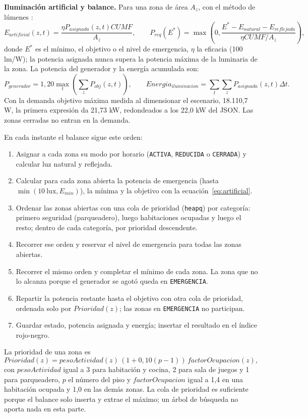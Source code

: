 \documentclass[12pt,a4paper]{article}
\newcommand{\estado}[1]{\texttt{#1}}
\newcommand{\codigo}[1]{\texttt{#1}}
\begin{document}
\textbf{Iluminación artificial y balance.} Para una zona de área $A_z$, con el método de lúmenes \cite{iesHandbook}:
\begin{equation}
 E_{artificial}(z,t)=\frac{\eta P_{asignada}(z,t)CU MF}{A_z},\qquad
 P_{req}(E^*)=\max\left(0,\frac{E^*-E_{natural}-E_{reflejada}}{\eta CU MF/A_z}\right),
 \label{eq:artificial}
\end{equation}
donde $E^*$ es el mínimo, el objetivo o el nivel de emergencia, $\eta$ la eficacia (100 lm/W); la potencia asignada nunca supera la potencia máxima de la luminaria de la zona. La potencia del generador y la energía acumulada son:
\begin{equation}
 P_{generador}=1,20\max_t\left(\sum_zP_{obj}(z,t)\right),\qquad
 Energia_{iluminacion}=\sum_t\sum_zP_{asignada}(z,t)\Delta t.
 \label{eq:generador}
\end{equation}
Con la demanda objetivo máxima medida al dimensionar el escenario, 18.110,7 W, la primera expresión da 21,73 kW, redondeados a los 22,0 kW del JSON. Las zonas cerradas no entran en la demanda.

En cada instante el balance sigue este orden:
\begin{enumerate}
    \item Asignar a cada zona su modo por horario (\estado{ACTIVA}, \estado{REDUCIDA} o \estado{CERRADA}) y calcular luz natural y reflejada.
    \item Calcular para cada zona abierta la potencia de emergencia (hasta $\min(10\ \text{lux}, E_{min})$), la mínima y la objetivo con la ecuación~\ref{eq:artificial}.
    \item Ordenar las zonas abiertas con una cola de prioridad (\codigo{heapq}) por categoría: primero seguridad (parqueadero), luego habitaciones ocupadas y luego el resto; dentro de cada categoría, por prioridad descendente.
    \item Recorrer ese orden y reservar el nivel de emergencia para todas las zonas abiertas.
    \item Recorrer el mismo orden y completar el mínimo de cada zona. La zona que no lo alcanza porque el generador se agotó queda en \estado{EMERGENCIA}.
    \item Repartir la potencia restante hasta el objetivo con otra cola de prioridad, ordenada solo por $Prioridad(z)$; las zonas en \estado{EMERGENCIA} no participan.
    \item Guardar estado, potencia asignada y energía; insertar el resultado en el índice rojo-negro.
\end{enumerate}
La prioridad de una zona es
\begin{equation}
 Prioridad(z)=pesoActividad(z)\,(1+0,10(p-1))\,factorOcupacion(z),
 \label{eq:prioridad}
\end{equation}
con $pesoActividad$ igual a 3 para habitación y cocina, 2 para sala de juegos y 1 para parqueadero, $p$ el número del piso y $factorOcupacion$ igual a 1,4 en una habitación ocupada y 1,0 en las demás zonas. La cola de prioridad es suficiente porque el balance solo inserta y extrae el máximo; un árbol de búsqueda no aporta nada en esta parte.
\end{document}

